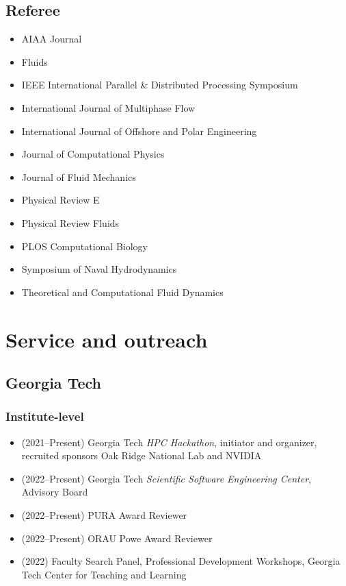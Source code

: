 \subsection{Referee}

\begin{itemize}
    \item AIAA Journal
    \item Fluids
    \item IEEE International Parallel \& Distributed Processing Symposium
    \item International Journal of Multiphase Flow
    \item International Journal of Offshore and Polar Engineering
    \item Journal of Computational Physics
    \item Journal of Fluid Mechanics
    \item Physical Review E
    \item Physical Review Fluids
    \item PLOS Computational Biology
    \item Symposium of Naval Hydrodynamics
    \item Theoretical and Computational Fluid Dynamics
\end{itemize}

\section{Service and outreach}

\subsection{Georgia Tech}

\subsubsection{Institute-level}

\begin{itemize}
    \item (2021--Present) Georgia Tech \textit{HPC Hackathon}, initiator and organizer, recruited sponsors Oak Ridge National Lab and NVIDIA 
    \item (2022--Present) Georgia Tech \textit{Scientific Software Engineering Center}, Advisory Board
    \item (2022--Present) PURA Award Reviewer
    \item (2022--Present) ORAU Powe Award Reviewer
    \item (2022) Faculty Search Panel, Professional Development Workshops, Georgia Tech Center for Teaching and Learning
\end{itemize}

